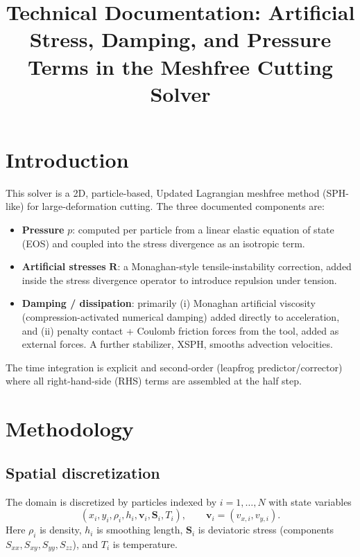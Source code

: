 \documentclass[11pt]{article}
\title{Technical Documentation: Artificial Stress, Damping, and Pressure Terms in the Meshfree Cutting Solver}
\author{}
\date{}
\begin{document}
\maketitle

\section{Introduction}

This solver is a 2D, particle-based, Updated Lagrangian meshfree method (SPH-like) for large-deformation cutting. The three documented components are:

\begin{itemize}
  \item \textbf{Pressure} $p$: computed per particle from a linear elastic equation of state (EOS) and coupled into the stress divergence as an isotropic term.
  \item \textbf{Artificial stresses} $\bm{R}$: a Monaghan-style tensile-instability correction, added inside the stress divergence operator to introduce repulsion under tension.
  \item \textbf{Damping / dissipation}: primarily (i) Monaghan artificial viscosity (compression-activated numerical damping) added directly to acceleration, and (ii) penalty contact + Coulomb friction forces from the tool, added as external forces. A further stabilizer, XSPH, smooths advection velocities.
\end{itemize}

The time integration is explicit and second-order (leapfrog predictor/corrector) where all right-hand-side (RHS) terms are assembled at the half step.

\section{Methodology}

\subsection{Spatial discretization}

The domain is discretized by particles indexed by $i=1,\dots,N$ with state variables
\begin{equation}
(x_i,y_i,\rho_i,h_i,\bm{v}_i,\bm{S}_i,T_i), \qquad \bm{v}_i=(v_{x,i},v_{y,i}).
\label{eq:state}
\end{equation}
Here $\rho_i$ is density, $h_i$ is smoothing length, $\bm{S}_i$ is deviatoric stress (components $S_{xx},S_{xy},S_{yy},S_{zz}$), and $T_i$ is temperature.
\end{document}
